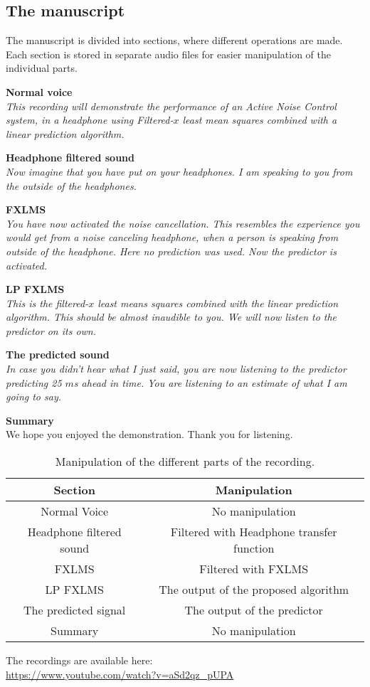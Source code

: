 \subsection{The manuscript}
The manuscript is divided into sections, where different operations are made. Each section is stored in separate audio files for easier manipulation of the individual parts. 
 
\textbf{Normal voice}\\
\textit{This recording will demonstrate the performance of an Active Noise Control  system, in a headphone using Filtered-$x$ least mean squares combined with a linear prediction algorithm.} 

\textbf{Headphone filtered sound}\\
\textit{Now imagine that you have put on your headphones. I am speaking to you from the outside of the headphones.}

\textbf{FXLMS}\\
\textit{You have now activated the noise cancellation. This resembles the experience you would get from a noise canceling headphone, when a person is speaking from outside of the headphone. 
Here no prediction was used. Now the predictor is activated. }

\textbf{LP FXLMS}\\
\textit{This is the filtered-$x$ least means squares combined with the linear prediction algorithm. This should be almost inaudible to you. We will now listen to the predictor on its own.}

\textbf{The predicted sound}\\
\textit{In case you didn't hear what I just said, you are now listening to the predictor predicting 25 $m$s ahead in time. You are listening to an estimate of what I am going to say.}

\textbf{Summary}\\
We hope you enjoyed the demonstration. Thank you for listening.

\begin{table}[H]
	\centering
	\begin{tabular}{ c c } \toprule
		{Section}				& {Manipulation} \\ \bottomrule 
		Normal Voice			& No manipulation  	\\
		Headphone filtered sound& Filtered with Headphone transfer function \\
		FXLMS					& Filtered with FXLMS	\\
		LP FXLMS 				& The output of the proposed algorithm	\\
		The predicted signal 	& The output of the predictor	\\
		Summary 				& No manipulation	\\
		\bottomrule
	\end{tabular}
	\caption{Manipulation of the different parts of the recording.}
	\label{tab:VoiceRecSections}
\end{table}

The recordings are available here: \\
\url{https://www.youtube.com/watch?v=aSd2qz_pUPA} 













